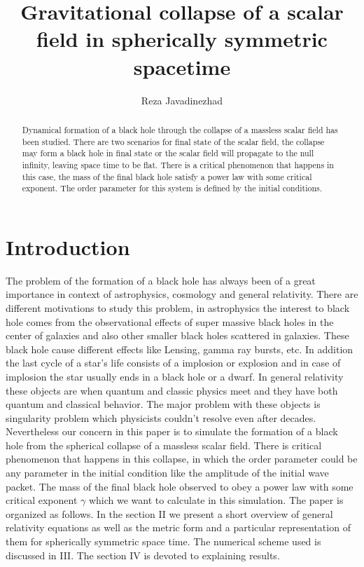 \documentclass[a4paper,11pt]{article}
\title{Gravitational collapse of a scalar field in spherically symmetric spacetime}
\author{Reza Javadinezhad}
\begin{document}
	\maketitle
\begin{abstract}
Dynamical formation of a black hole through the collapse of a massless scalar field has been studied. There are two scenarios for final state of the scalar field, the collapse may form a black hole in final state or the scalar field will propagate to the null infinity, leaving space time to be flat. There is a critical phenomenon that happens in this case, the mass of the final black hole satisfy a power law with some critical exponent. The order parameter for this system is defined by the initial conditions. 
\end{abstract} 

\section{Introduction}
The problem of the formation of a black hole has always been of a great importance in context of astrophysics, cosmology and general relativity. There are different motivations to study this problem, in astrophysics the interest to black hole comes from the observational effects  of super massive black holes in the center of galaxies and also other smaller black holes scattered in galaxies. These black hole cause different effects like Lensing, gamma ray bursts, etc.  In addition the last cycle of a star's life consists of a implosion or explosion and in case of implosion the star usually ends in a black hole or a dwarf. In general relativity these objects are when quantum and classic physics meet and they have both quantum and classical behavior. The major problem with these objects is singularity problem which physicists couldn't resolve even after decades. Nevertheless our concern in this paper is to simulate the formation of a black hole from the spherical collapse of a massless scalar field. There is critical phenomenon that happens in this collapse, in which the order parameter could be any parameter in the initial condition like the amplitude of the initial wave packet. The mass of the final black hole observed to obey a power law with some critical exponent $\gamma$ which we want to calculate in this simulation. The paper is organized as follows. In the section II we present a short overview of general relativity equations as well as the metric form and a particular representation of them for spherically symmetric space time. The numerical scheme used is discussed in III.  The section IV is devoted to explaining results.
\end{document}
